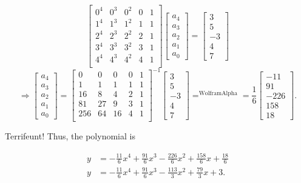 \documentclass[../key.tex]{subfiles}
\begin{document}
$$\begin{bmatrix}
0^4 & 0^3 & 0^2 & 0 & 1 \\
1^4 & 1^3 & 1^2 & 1 & 1 \\
2^4 & 2^3 & 2^2 & 2 & 1 \\
3^4 & 3^3 & 3^2 & 3 & 1 \\
4^4 & 4^3 & 4^2 & 4 & 1 \\
\end{bmatrix} \begin{bmatrix}
a_4 \\ a_3 \\ a_2 \\ a_1 \\ a_0
\end{bmatrix} = \begin{bmatrix}
3 \\ 5 \\ -3 \\ 4 \\ 7
\end{bmatrix}$$
$$\Longrightarrow \begin{bmatrix}
a_4 \\ a_3 \\ a_2 \\ a_1 \\ a_0
\end{bmatrix} = \begin{bmatrix}
0 & 0 & 0 & 0 & 1 \\
1 & 1 & 1 & 1 & 1 \\
16 & 8 & 4 & 2 & 1 \\
81 & 27 & 9 & 3 & 1 \\
256 & 64 & 16 & 4 & 1 \\
\end{bmatrix}^{-1} \begin{bmatrix}
3 \\ 5 \\ -3 \\ 4 \\ 7
\end{bmatrix} \mathop{=}^{\text{WolframAlpha}} =
\frac{1}{6} \begin{bmatrix}
-11 \\ 91 \\ -226 \\ 158 \\ 18
\end{bmatrix}.$$

Terrifeunt! Thus, the polynomial is

\begin{align*}
y &= -\frac{11}{6}x^4 + \frac{91}{6}x^3 - \frac{226}{6}x^2 + \frac{158}{6}x + \frac{18}{6} \\
y &= -\frac{11}{6}x^4 + \frac{91}{6}x^3 - \frac{113}{3}x^2 + \frac{79}{3}x + 3.
\end{align*}
\end{document}
